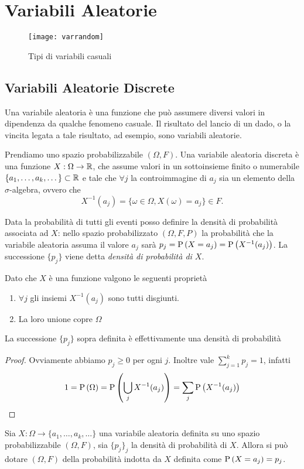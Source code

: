 \chapter{Variabili Aleatorie}

\begin{figure}[H]
    \centering
    \caption{Tipi di variabili casuali}
    \texttt{[image: varrandom]}
\end{figure}

\section{Variabili Aleatorie Discrete}


Una variabile aleatoria \`e una funzione che pu\`o  assumere diversi valori in dipendenza da qualche fenomeno casuale.
Il risultato del lancio di un dado, o la vincita legata a tale risultato, ad esempio, sono variabili aleatorie.
\begin{defn}
    Prendiamo uno spazio probabilizzabile $ (\Omega, F) $. Una variabile aleatoria discreta \`e una funzione $ X : \Omega \to \mathbb{R} $, che assume valori in un sottoinsieme finito o numerabile
    $ \{a_1, \dots, a_k, \dots \} \subset \mathbb{R}$ e tale che 
    $ \forall j $ la controimmagine di $a_j$ sia un elemento della $\sigma$-algebra, ovvero che
    $$ X^{-1}(a_j) = \{ \omega \in \Omega, X(\omega) = a_j\} \in F. $$
\end{defn}

\begin{defn}
    Data la probabilit\`a  di tutti gli eventi posso definire la densit\`a  di probabilit\`a associata ad $X$: nello spazio probabilizzato $ (\Omega, F, P) $ la probabilit\`a  che la variabile aleatoria assuma il valore $ a_j $ sar\`a  $ p_j = \text{P}\left(X = a_j\right) = \text{P}\left(X^{-1}(a_j)\right) $. La successione $\{p_j\}$ viene detta {\em densit\`a  di probabilit\`a di $X$}.
\end{defn}
Dato che $X$ \`e una funzione valgono le seguenti propriet\`a

\begin{enumerate}
    \item $ \forall j$ gli insiemi $X^{-1} (a_j) $ sono tutti disgiunti.
    \item La loro unione copre $ \Omega $
\end{enumerate}
\begin{prop}
    La successione $\{p_j\}$ sopra definita  \`e  effettivamente una densit\`a  di probabilit\`a
\end{prop}
\begin{proof} Ovviamente abbiamo $p_j\ge0$ per ogni $j$. Inoltre vale $ \sum_{j=1}^{k} p_j = 1 $, infatti
    \begin{equation*}
        1 = \text{P}\left(\Omega\right) = \text{P}\left(\bigcup_{j} X^{-1}(a_j)\right) = \sum_{j} \text{P}\left(X^{-1}(a_j)\right)
    \end{equation*}
\end{proof}
Sia $ X : \Omega \to \{ a_1, \dots, a_k ,\dots \} $ una variabile aleatoria definita su uno spazio probabilizzabile $ (\Omega, F) $, sia $\{p_j\}_j$ la densit\`a  di probabilit\`a di $X$. Allora si pu\`o dotare
$ (\Omega, F) $ della probabilit\`a indotta da $X$ definita come $ \text{P}\left(X = a_j\right) = p_j $.

